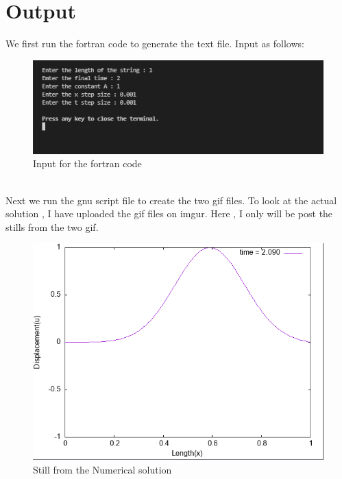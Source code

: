 \documentclass[oneside,hidelinks]{book}
\begin{document}
                                \section{Output}
                                We first run the fortran code to generate the text file. 
                                Input as follows:\\
                                \begin{figure}[hbtp]
                                        \caption{Input for the fortran code}
                                        \hspace*{3cm}\includegraphics[scale=0.7]{wavepulse_fortran.png}        
                                \end{figure}\\
                                Next we run the gnu script file to create the two gif files. To look at the actual solution , I have uploaded 
                                the gif files on imgur. Here , I only will be post the stills from the two gif.
                                \begin{figure}[hbtp]
                                        \caption{Still from the Numerical solution}
                                        \hspace*{3cm}\includegraphics[scale=0.6]{wavepulse_still_numerical.png}        
                                \end{figure}
\end{document}
